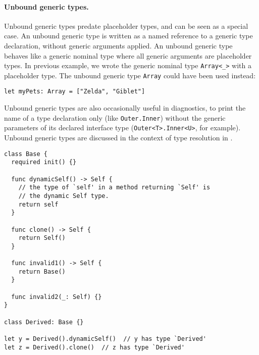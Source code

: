 \documentclass[../generics]{subfiles}
\begin{document}
\paragraph{Unbound generic types.}
Unbound generic types predate placeholder types, and can be seen as a special case. An unbound generic type is written as a named reference to a generic type declaration, without generic arguments applied. An unbound generic type behaves like a generic nominal type where all generic arguments are placeholder types. In previous example, we wrote the generic nominal type \verb|Array<_>| with a placeholder type. The unbound generic type \texttt{Array} could have been used instead:
\begin{Verbatim}
let myPets: Array = ["Zelda", "Giblet"]
\end{Verbatim}
Unbound generic types are also occasionally useful in diagnostics, to print the name of a type declaration only (like \texttt{Outer.Inner}) without the generic parameters of its declared interface type (\texttt{Outer<T>.Inner<U>}, for example). Unbound generic types are discussed in the context of type resolution in .

\begin{listing}\label{dynamic self example}
\begin{Verbatim}
class Base {
  required init() {}
  
  func dynamicSelf() -> Self {
    // the type of `self' in a method returning `Self' is
    // the dynamic Self type.
    return self
  }

  func clone() -> Self {
    return Self()
  }
  
  func invalid1() -> Self {
    return Base()
  }
  
  func invalid2(_: Self) {}
}

class Derived: Base {}

let y = Derived().dynamicSelf()  // y has type `Derived'
let z = Derived().clone()  // z has type `Derived'
\end{Verbatim}
\end{listing}
\end{document}
